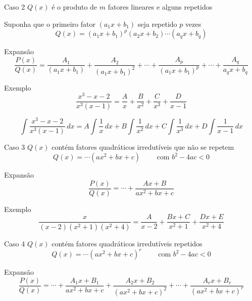 \begin{frame}{Caso 2}
  $Q(x)$ é o produto de $m$ fatores lineares e alguns repetidos

  \pause
  Suponha que o primeiro fator $(a_1 x + b_1)$ seja repetido $p$ vezes
  \[
    Q(x)
    = \left(a_1 x + b_1\right)^p
      \left(a_2 x + b_2\right) \cdots
      \left(a_q x + b_q\right)
  \]

  \pause
  Expansão
  \[
    \frac{P(x)}{Q(x)}
    = \frac{A_1}{(a_1x+b_1)}
    + \frac{A_2}{(a_1x+b_1)^2}
    + \cdots
    + \frac{A_p}{(a_1x+b_1)^p}
    + \cdots
    + \frac{A_q}{a_q x + b_q}
  \]
\end{frame}

\begin{frame}{Exemplo}
  \[
    \frac{x^3-x-2}{x^3(x-1)}
    = \frac{A}{x}
    + \frac{B}{x^2}
    + \frac{C}{x^3}
    + \frac{D}{x-1}
  \]

  \pause
  \vspace{\baselineskip}
  \[
    \int \frac{x^3-x-2}{x^3(x-1)} \,dx
    = A \int \frac{1}{x} \,dx
    + B \int \frac{1}{x^2} \,dx
    + C \int \frac{1}{x^3} \,dx
    + D \int \frac{1}{x-1} \,dx
  \]
\end{frame}

\begin{frame}{Caso 3}
  $Q(x)$ contém fatores quadráticos irredutíveis que não se repetem
  \[
    Q(x) = \cdots  \left( ax^2 + bx + c \right)
    \qquad
    \text{ com } b^2-4ac<0
  \]

  \pause
  Expansão
  \[
    \frac{P(x)}{Q(x)}
    = \cdots
    + \frac{Ax+B}{ax^2 + bx + c}
  \]
\end{frame}

\begin{frame}{Exemplo}
  \[
    \frac{x}{(x-2)(x^2+1)(x^2+4)}
    = \frac{A}{x-2}
    + \frac{Bx+C}{x^2+1}
    + \frac{Dx+E}{x^2+4}
  \]
\end{frame}

\begin{frame}{Caso 4}
  $Q(x)$ contém fatores quadráticos irredutíveis repetidos
  \[
    Q(x) = \cdots  \left( ax^2 + bx + c \right)^r
    \qquad
    \text{ com } b^2-4ac<0
  \]

  \pause
  Expansão
  \[
    \frac{P(x)}{Q(x)}
    = \cdots
    + \frac{A_1x+B_1}{ax^2+bx+c}
    + \frac{A_2x+B_2}{(ax^2+bx+c)^2}
    + \cdots
    + \frac{A_rx+B_r}{(ax^2+bx+c)^r}
  \]
\end{frame}

